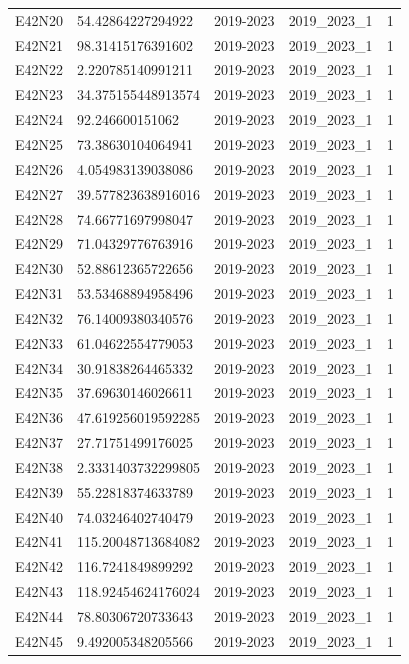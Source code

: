 \begin{landscape}
\begin{longtable}{lllll}
E42N20 & 54.42864227294922 & 2019-2023 & 2019\_2023\_1 & 1 \\
E42N21 & 98.31415176391602 & 2019-2023 & 2019\_2023\_1 & 1 \\
E42N22 & 2.220785140991211 & 2019-2023 & 2019\_2023\_1 & 1 \\
E42N23 & 34.375155448913574 & 2019-2023 & 2019\_2023\_1 & 1 \\
E42N24 & 92.246600151062 & 2019-2023 & 2019\_2023\_1 & 1 \\
E42N25 & 73.38630104064941 & 2019-2023 & 2019\_2023\_1 & 1 \\
E42N26 & 4.054983139038086 & 2019-2023 & 2019\_2023\_1 & 1 \\
E42N27 & 39.577823638916016 & 2019-2023 & 2019\_2023\_1 & 1 \\
E42N28 & 74.66771697998047 & 2019-2023 & 2019\_2023\_1 & 1 \\
E42N29 & 71.04329776763916 & 2019-2023 & 2019\_2023\_1 & 1 \\
E42N30 & 52.88612365722656 & 2019-2023 & 2019\_2023\_1 & 1 \\
E42N31 & 53.53468894958496 & 2019-2023 & 2019\_2023\_1 & 1 \\
E42N32 & 76.14009380340576 & 2019-2023 & 2019\_2023\_1 & 1 \\
E42N33 & 61.04622554779053 & 2019-2023 & 2019\_2023\_1 & 1 \\
E42N34 & 30.91838264465332 & 2019-2023 & 2019\_2023\_1 & 1 \\
E42N35 & 37.69630146026611 & 2019-2023 & 2019\_2023\_1 & 1 \\
E42N36 & 47.619256019592285 & 2019-2023 & 2019\_2023\_1 & 1 \\
E42N37 & 27.71751499176025 & 2019-2023 & 2019\_2023\_1 & 1 \\
E42N38 & 2.3331403732299805 & 2019-2023 & 2019\_2023\_1 & 1 \\
E42N39 & 55.22818374633789 & 2019-2023 & 2019\_2023\_1 & 1 \\
E42N40 & 74.03246402740479 & 2019-2023 & 2019\_2023\_1 & 1 \\
E42N41 & 115.20048713684082 & 2019-2023 & 2019\_2023\_1 & 1 \\
E42N42 & 116.7241849899292 & 2019-2023 & 2019\_2023\_1 & 1 \\
E42N43 & 118.92454624176024 & 2019-2023 & 2019\_2023\_1 & 1 \\
E42N44 & 78.80306720733643 & 2019-2023 & 2019\_2023\_1 & 1 \\
E42N45 & 9.492005348205566 & 2019-2023 & 2019\_2023\_1 & 1 \\

\end{longtable}
\end{landscape}
